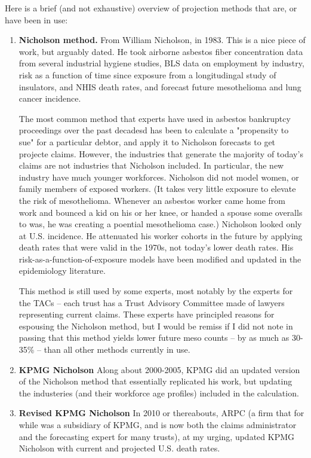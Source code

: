 \documentclass{article}\usepackage{graphicx, color}
\begin{document}
Here is a brief (and not exhaustive) overview of projection methods that are, or have been in use:

\begin{enumerate}
  \item \textbf{Nicholson method.}  From William Nicholson, in 1983.  This is a nice piece of work, but arguably dated.  He took airborne asbestos fiber concentration data from several industrial hygiene studies, BLS data on employment by industry, risk as a function of time since exposure from a longitudingal study of insulators, and NHIS death rates, and forecast future mesothelioma and lung cancer incidence. 
  
The most common method that experts have used in asbestos bankruptcy proceedings over the past decadesd has been to calculate a "propensity to sue" for a particular debtor, and apply it to Nicholson forecasts to get projecte claims.  However, the industries that generate the majority of today's claims are not industries that Nicholson included.  In particular, the new industry have much younger workforces.  Nicholson did not model women, or family members of exposed workers.  (It takes very little exposure to elevate the risk of mesothelioma.  Whenever an asbestos worker came home from work and bounced a kid on his or her knee, or handed a spouse some overalls to was, he was creating a poential mesothelioma case.)  Nicholson looked only at U.S. incidence.  He attenuated his worker cohorts in the future by applying death rates that were valid in the 1970s, not today's lower death rates.  His risk-as-a-function-of-exposure models have been modified and updated in the epidemiology literature. 

This method is still used by some experts, most notably by the experts for the TACs -- each trust has a Trust Advisory Committee made of lawyers representing current claims.  These experts have principled reasons for espousing the Nicholson method, but I would be remiss if I did not note in passing that this method yields lower future meso counts -- by as much as 30-35\% -- than all other methods currently in use. 

\item \textbf{KPMG Nicholson} Along about 2000-2005, KPMG did an updated version of the Nicholson method that essentially replicated his work, but updating the industeries (and their workforce age profiles) included in the calculation.

\item \textbf{Revised KPMG Nicholson}  In 2010 or thereabouts, ARPC (a firm that for while was a subsidiary of KPMG, and is now both the claims administrator and the forecasting expert for many trusts), at my urging, updated KPMG Nicholson with current and projected U.S. death rates.


\end{enumerate}
\end{document}
